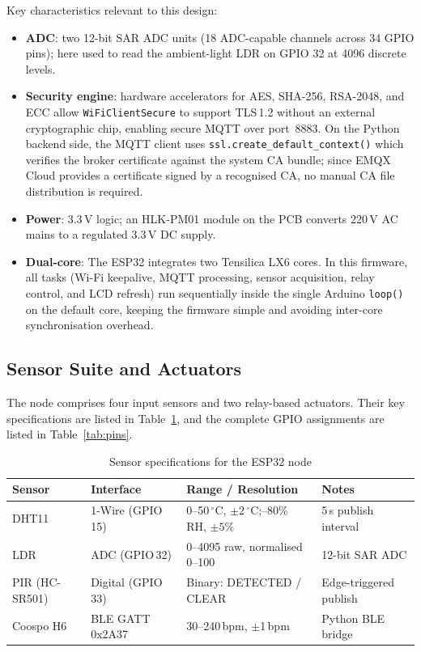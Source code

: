 Key characteristics relevant to this design:

\begin{itemize}

\item \textbf{ADC}: two 12-bit SAR ADC units (18 ADC-capable channels across 34 GPIO pins);
here used to read the ambient-light LDR on GPIO 32 at 4096 discrete levels.
\item \textbf{Security engine}: hardware accelerators for AES, SHA-256,
RSA-2048, and ECC allow \texttt{WiFiClientSecure} to support TLS\,1.2
without an external cryptographic chip, enabling secure MQTT over
port~8883. On the Python backend side, the MQTT client uses
\texttt{ssl.create\_default\_context()} which verifies the broker
certificate against the system CA bundle; since EMQX Cloud provides a
certificate signed by a recognised CA, no manual CA file distribution
is required.
\item \textbf{Power}: 3.3\,V logic; an HLK-PM01 module on the PCB
converts 220\,V AC mains to a regulated 3.3\,V DC supply.
\item \textbf{Dual-core}: The ESP32 integrates two Tensilica LX6 cores.
In this firmware, all tasks (Wi-Fi keepalive, MQTT processing, sensor
acquisition, relay control, and LCD refresh) run sequentially inside the
single Arduino \texttt{loop()} on the default core, keeping the firmware
simple and avoiding inter-core synchronisation overhead.

\end{itemize}

\subsection{Sensor Suite and Actuators}

The node comprises four input sensors and two relay-based actuators.
Their key specifications are listed in Table~\ref{tab:sensor_specs}, and
the complete GPIO assignments are listed in Table~\ref{tab:pins}.

\begin{table}[H]
\centering
\caption{Sensor specifications for the ESP32 node}
\label{tab:sensor_specs}
\small
\begin{tabular}{p{3cm}p{3.5cm}p{4.5cm}p{2.5cm}}
\toprule
\textbf{Sensor} & \textbf{Interface} & \textbf{Range / Resolution} & \textbf{Notes} \\
\midrule
DHT11           & 1-Wire (GPIO\,15)    & 0--50\,$^\circ$C, $\pm2\,^\circ$C;\newline 20--80\% RH, $\pm5$\% & 5\,s publish interval \\
LDR             & ADC (GPIO\,32)       & 0--4095 raw, normalised 0--100 & 12-bit SAR ADC \\
PIR (HC-SR501)  & Digital (GPIO\,33)   & Binary: DETECTED / CLEAR       & Edge-triggered publish \\
Coospo H6       & BLE GATT\,0x2A37~\cite{BluetoothSIG2011}     & 30--240\,bpm, $\pm$1\,bpm      & Python BLE bridge \\
\bottomrule
\end{tabular}
\end{table}


